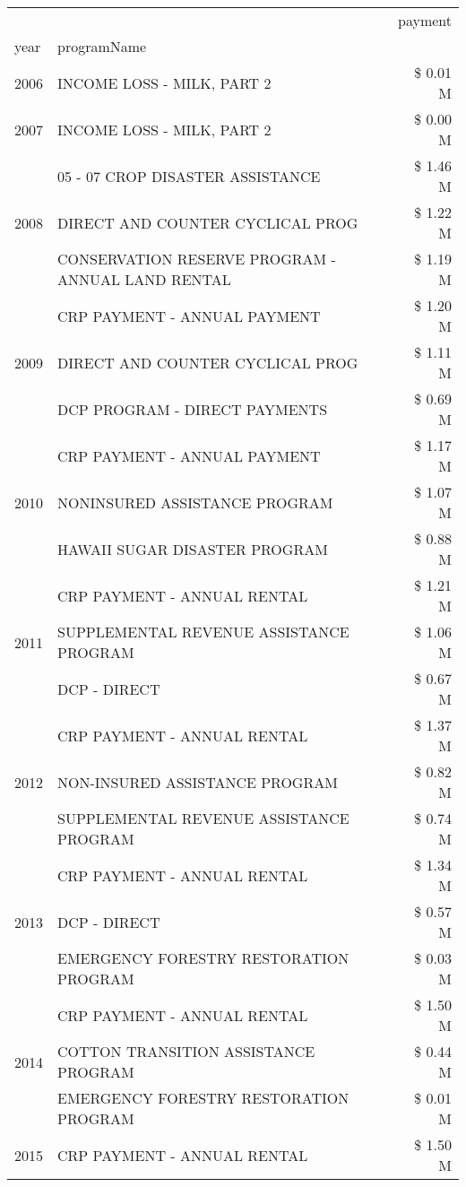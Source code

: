 \begin{tabular}{llr}
\toprule
 &  & payment \\
year & programName &  \\
\midrule
2006 & INCOME LOSS - MILK, PART 2 & \$ 0.01 M \\
\cline{1-3}
2007 & INCOME LOSS - MILK, PART 2 & \$ 0.00 M \\
\cline{1-3}
\multirow[t]{3}{*}{2008} & 05 - 07 CROP DISASTER ASSISTANCE & \$ 1.46 M \\
 & DIRECT AND COUNTER CYCLICAL PROG & \$ 1.22 M \\
 & CONSERVATION RESERVE PROGRAM - ANNUAL LAND RENTAL & \$ 1.19 M \\
\cline{1-3}
\multirow[t]{3}{*}{2009} & CRP PAYMENT - ANNUAL PAYMENT & \$ 1.20 M \\
 & DIRECT AND COUNTER CYCLICAL PROG & \$ 1.11 M \\
 & DCP PROGRAM - DIRECT PAYMENTS & \$ 0.69 M \\
\cline{1-3}
\multirow[t]{3}{*}{2010} & CRP PAYMENT - ANNUAL PAYMENT & \$ 1.17 M \\
 & NONINSURED ASSISTANCE PROGRAM & \$ 1.07 M \\
 & HAWAII SUGAR DISASTER PROGRAM & \$ 0.88 M \\
\cline{1-3}
\multirow[t]{3}{*}{2011} & CRP PAYMENT - ANNUAL RENTAL & \$ 1.21 M \\
 & SUPPLEMENTAL REVENUE ASSISTANCE PROGRAM & \$ 1.06 M \\
 & DCP - DIRECT & \$ 0.67 M \\
\cline{1-3}
\multirow[t]{3}{*}{2012} & CRP PAYMENT - ANNUAL RENTAL & \$ 1.37 M \\
 & NON-INSURED ASSISTANCE PROGRAM & \$ 0.82 M \\
 & SUPPLEMENTAL REVENUE ASSISTANCE PROGRAM & \$ 0.74 M \\
\cline{1-3}
\multirow[t]{3}{*}{2013} & CRP PAYMENT - ANNUAL RENTAL & \$ 1.34 M \\
 & DCP - DIRECT & \$ 0.57 M \\
 & EMERGENCY FORESTRY RESTORATION PROGRAM & \$ 0.03 M \\
\cline{1-3}
\multirow[t]{3}{*}{2014} & CRP PAYMENT - ANNUAL RENTAL & \$ 1.50 M \\
 & COTTON TRANSITION ASSISTANCE PROGRAM & \$ 0.44 M \\
 & EMERGENCY FORESTRY RESTORATION PROGRAM & \$ 0.01 M \\
\cline{1-3}
\multirow[t]{3}{*}{2015} & CRP PAYMENT - ANNUAL RENTAL & \$ 1.50 M \\

\end{tabular}
